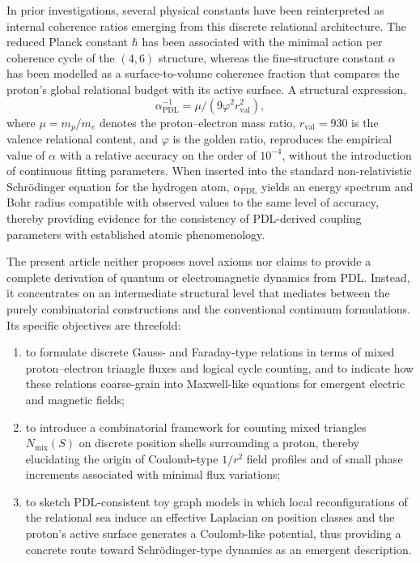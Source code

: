 \documentclass[11pt,a4paper]{article}
\begin{document}
In prior investigations, several physical constants have been reinterpreted as internal coherence ratios emerging from this discrete relational architecture.
The reduced Planck constant $\hbar$ has been associated with the minimal action per coherence cycle of the $(4,6)$ structure, whereas the fine-structure constant $\alpha$ has been modelled as a surface-to-volume coherence fraction that compares the proton’s global relational budget with its active surface.\cite{Laubscher2026FullPDL,Laubscher2026Alpha}
A structural expression,
\[
\alpha^{-1}_{\mathrm{PDL}} = \mu / (9\varphi^{2} r_{\mathrm{val}}^{2}),
\]
where $\mu=m_{p}/m_{e}$ denotes the proton–electron mass ratio, $r_{\mathrm{val}}=930$ is the valence relational content, and $\varphi$ is the golden ratio, reproduces the empirical value of $\alpha$ with a relative accuracy on the order of $10^{-4}$, without the introduction of continuous fitting parameters.\cite{Laubscher2026Alpha,Laubscher2026GoldenRatioSurface}
When inserted into the standard non-relativistic Schr\"odinger equation for the hydrogen atom, $\alpha_{\mathrm{PDL}}$ yields an energy spectrum and Bohr radius compatible with observed values to the same level of accuracy, thereby providing evidence for the consistency of PDL-derived coupling parameters with established atomic phenomenology.\cite{Laubscher2026SchrodingerPDL}

The present article neither proposes novel axioms nor claims to provide a complete derivation of quantum or electromagnetic dynamics from PDL.
Instead, it concentrates on an intermediate structural level that mediates between the purely combinatorial constructions and the conventional continuum formulations.
Its specific objectives are threefold:
\begin{enumerate}
  \item to formulate discrete Gauss- and Faraday-type relations in terms of mixed proton–electron triangle fluxes and logical cycle counting, and to indicate how these relations coarse-grain into Maxwell-like equations for emergent electric and magnetic fields;
  \item to introduce a combinatorial framework for counting mixed triangles $N_{\mathrm{mix}}(S)$ on discrete position shells surrounding a proton, thereby elucidating the origin of Coulomb-type $1/r^{2}$ field profiles and of small phase increments associated with minimal flux variations;
  \item to sketch PDL-consistent toy graph models in which local reconfigurations of the relational sea induce an effective Laplacian on position classes and the proton’s active surface generates a Coulomb-like potential, thus providing a concrete route toward Schr\"odinger-type dynamics as an emergent description.
\end{enumerate}
\end{document}
